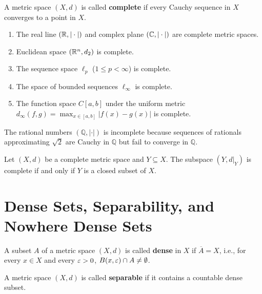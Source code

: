 \begin{definition}
A metric space $(X,d)$ is called \textbf{complete} if every Cauchy sequence in $X$ converges to a point in $X$.
\end{definition}

\begin{theorem}
\begin{enumerate}[label=\rm{(\roman*)}]
    \item The real line $(\mathbb{R}, |\cdot|)$ and complex plane $(\mathbb{C}, |\cdot|)$ are complete metric spaces.
    \item Euclidean space $(\mathbb{R}^n, d_2)$ is complete.
    \item The sequence space $\ell_p$ ($1 \le p < \infty$) is complete.
    \item The space of bounded sequences $\ell_\infty$ is complete.
    \item The function space $C[a,b]$ under the uniform metric $d_\infty(f,g) = \max_{x \in [a,b]} |f(x)-g(x)|$ is complete.
\end{enumerate}
\end{theorem}

\begin{example}
The rational numbers $(\mathbb{Q}, |\cdot|)$ is incomplete because sequences of rationals approximating $\sqrt{2}$ are Cauchy in $\mathbb{Q}$ but fail to converge in $\mathbb{Q}$.
\end{example}

\begin{theorem}
Let $(X,d)$ be a complete metric space and $Y \subseteq X$. The subspace $(Y, d|_Y)$ is complete if and only if $Y$ is a closed subset of $X$.
\end{theorem}


\section{Dense Sets, Separability, and Nowhere Dense Sets}
\label{sec:density_separability}

\begin{definition}
A subset $A$ of a metric space $(X,d)$ is called \textbf{dense} in $X$ if $\overline{A} = X$, i.e., for every $x \in X$ and every $\varepsilon > 0$, $B(x,\varepsilon) \cap A \neq \emptyset$.
\end{definition}

\begin{definition}
A metric space $(X,d)$ is called \textbf{separable} if it contains a countable dense subset.
\end{definition}

